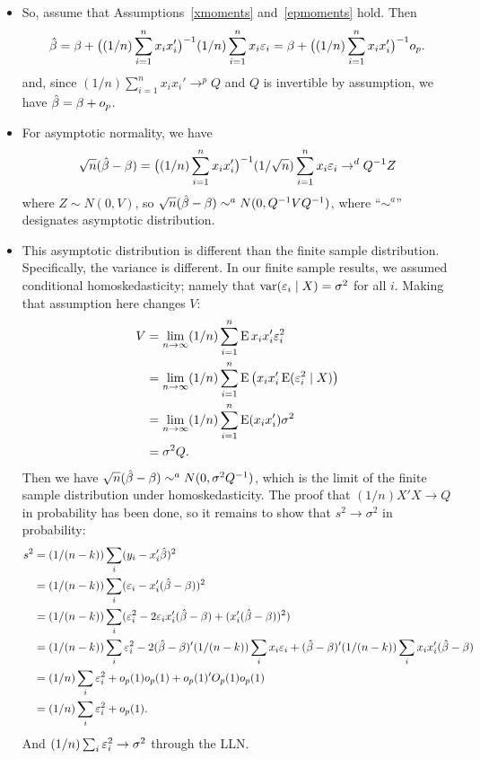 \begin{itemize}[leftmargin=0pt]
\item So, assume that Assumptions~\ref{xmoments} and~\ref{epmoments}
  hold.  Then
  \begin{equation*}
    \hat{\beta} 
    = \beta + \big( (1/n) \sum_{i=1}^n x_i x_i' \big)^{-1}
       (1/n) \sum_{i=1}^n x_i \varepsilon_i
    = \beta + \big( (1/n) \sum_{i=1}^n x_i x_i' \big)^{-1} o_p.
  \end{equation*}
  and, since $(1/n) \sum_{i=1}^n x_i x_i' \to^p Q$ and $Q$ is invertible by
  assumption, we have $\hat{\beta} = \beta + o_p$.

\item For asymptotic normality, we have
  \begin{equation*}
    \sqrt{n} (\hat{\beta} - \beta)
    = \big( (1/n) \sum_{i=1}^n x_i x_i' \big)^{-1}
      (1/\sqrt{n}) \sum_{i=1}^n x_i \varepsilon_i \to^d Q^{-1} Z
  \end{equation*}
  where $Z \sim N(0, V)$, so $\sqrt{n} (\hat{\beta} - \beta) \sim^a N(0, Q^{-1} V
  Q^{-1})$, where ``$\sim^a$'' designates asymptotic distribution.

\item This asymptotic distribution is different than the finite sample
  distribution.  Specifically, the variance is different.  In our
  finite sample results, we assumed conditional homoskedasticity;
  namely that $\operatorname{var}(\varepsilon_i \mid X) = \sigma^2$ for all $i$.  Making that
  assumption here changes $V$:
  \begin{align*}
    V
    &= \lim_{n \to \infty} (1/n) \sum_{i=1}^n \operatorname{E} x_i x_i' \varepsilon_i^2 \\
    &= \lim_{n \to \infty} (1/n) \sum_{i=1}^n \operatorname{E} \big( x_i x_i' \operatorname{E}(\varepsilon_i^2 \mid X) \big) \\
    &= \lim_{n \to \infty} (1/n) \sum_{i=1}^n \operatorname{E}( x_i x_i' ) \sigma^2 \\
    &= \sigma^2 Q.
  \end{align*}
  Then we have $\sqrt{n} (\hat{\beta} - \beta) \sim^a N(0, \sigma^2 Q^{-1})$, which is the
  limit of the finite sample distribution under homoskedasticity.  The
  proof that $(1/n) X'X \to Q$ in probability has been done, so it
  remains to show that $s^2 \to \sigma^2$ in probability:
  \begin{align*}
    s^2 &= (1/(n-k)) \sum_i (y_i - x_i'\hat{\beta})^2 \\
    &= (1/(n-k)) \sum_i (\varepsilon_i - x_i'(\hat{\beta} - \beta))^2 \\
    &= (1/(n-k)) \sum_i (\varepsilon_i^2 - 2 \varepsilon_i x_i'(\hat{\beta}-\beta) + (x_i'(\hat{\beta}-\beta))^2) \\
    &= (1/(n-k)) \sum_i \varepsilon_i^2
       - 2 (\hat{\beta} - \beta)' (1/(n-k)) \sum_i  x_i \varepsilon_i
       + (\hat{\beta} - \beta)' (1/(n-k)) \sum_i x_i x_i' (\hat{\beta} - \beta) \\
    &= (1/n) \sum_i \varepsilon_i^2 + o_p(1) o_p(1) + o_p(1)'O_p(1)o_p(1) \\
    &= (1/n) \sum_i \varepsilon_i^2 + o_p(1).
  \end{align*}
  And $(1/n) \sum_i \varepsilon_i^2 \to \sigma^2$ through the LLN.

\end{itemize}

